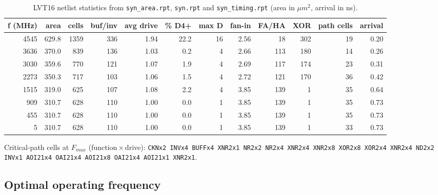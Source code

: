 \documentclass[11pt]{article}
\begin{document}
\begin{table}[H]
\begin{center}
\small
\begin{tabular}{r|r|r|r|r|r|r|r|r|r|r|r}
\hline
f (MHz) & area & cells & buf/inv & avg drive & \% D4+ & max D & fan-in & FA/HA & XOR & path cells & arrival \\
\hline
4545 & 629.8 & 1359 & 336 & 1.94 & 22.2 & 16 & 2.56 & 18 & 302 & 19 & 0.20 \\
3636 & 370.0 & 839 & 136 & 1.03 & 0.2 & 4 & 2.66 & 113 & 180 & 14 & 0.26 \\
3030 & 359.6 & 770 & 121 & 1.07 & 1.9 & 4 & 2.69 & 117 & 174 & 23 & 0.31 \\
2273 & 350.3 & 717 & 103 & 1.06 & 1.5 & 4 & 2.72 & 121 & 170 & 36 & 0.42 \\
1515 & 319.0 & 625 & 107 & 1.08 & 2.2 & 4 & 3.85 & 139 & 1 & 35 & 0.64 \\
909 & 310.7 & 628 & 110 & 1.00 & 0.0 & 1 & 3.85 & 139 & 1 & 35 & 0.73 \\
455 & 310.7 & 628 & 110 & 1.00 & 0.0 & 1 & 3.85 & 139 & 1 & 35 & 0.73 \\
5 & 310.7 & 628 & 110 & 1.00 & 0.0 & 1 & 3.85 & 139 & 1 & 33 & 0.73 \\
\hline
\end{tabular}
\end{center}
\caption{LVT16 netlist statistics from \texttt{syn\_area.rpt}, \texttt{syn.rpt} and \texttt{syn\_timing.rpt} (area in $\mu m^2$, arrival in ns).}
\end{table}
Critical-path cells at $F_{max}$ (function\,$\times$\,drive): \texttt{CKNx2 INVx4 BUFFx4 XNR2x1 NR2x2 NR2x4 XNR2x4 XNR2x8 XOR2x8 XOR2x4 XNR2x4 ND2x2 INVx1 AOI21x4 OAI21x4 AOI21x8 OAI21x4 AOI21x1 XNR2x1}.

\subsection*{Optimal operating frequency}
\end{document}
